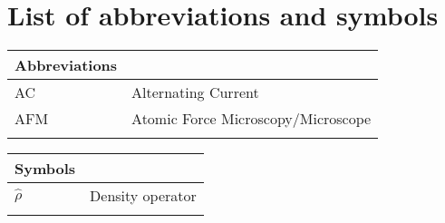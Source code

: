 
%
%

\chapter[List of abbreviations and symbols]{List of abbreviations and symbols}


\begin{center}
	\small
	\begin{longtable}{ll}
	\toprule
	Abbreviations & {} \\
	\bottomrule
	AC				& Alternating Current \\
	AFM				& Atomic Force Microscopy/Microscope \\
	\etc{}		&	\etc{} \\
	\hline
	\end{longtable}
\end{center}

\begin{center}
	\small
	\begin{longtable}{ll}
	\toprule
	Symbols & {} \\
	\bottomrule
	$\hat{\rho}$		& Density operator \\
	\etc{}					& \etc{} \\
	\hline
	\end{longtable}
\end{center}

